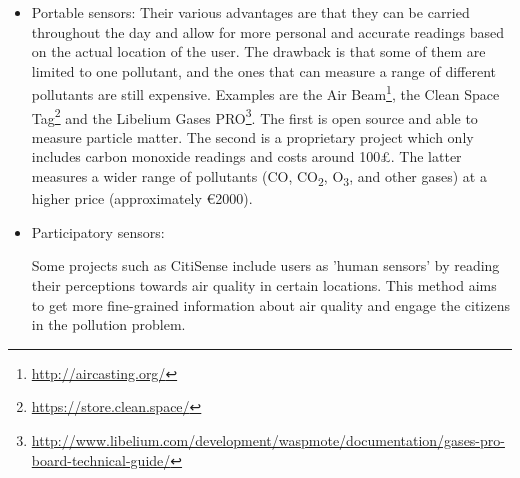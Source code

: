 \begin{itemize}
\item Portable sensors: Their various advantages are that they can be carried throughout the day and allow for more personal and accurate readings based on the actual location of the user. The drawback is that some of them are limited to one pollutant, and the ones that can measure a range of different pollutants are still expensive. Examples are the Air Beam\footnote{\url{http://aircasting.org/}}, the Clean Space Tag\footnote{\url{https://store.clean.space/}} and the Libelium Gases PRO\footnote{\url{http://www.libelium.com/development/waspmote/documentation/gases-pro-board-technical-guide/}}. The first is open source and able to measure particle matter. The second is a proprietary project which only includes carbon monoxide readings and costs around 100\pounds. The latter measures a wider range of pollutants (CO, CO\textsubscript{2}, O\textsubscript{3}, \NOX and other gases) at a higher price (approximately \euro{}2000). 

\item Participatory sensors:

Some projects such as CitiSense \cite{Nikzad2012} include users as 'human sensors' by reading their perceptions towards air quality in certain locations. This method aims to get more fine-grained information about air quality and engage the citizens in the pollution problem. 

\end{itemize}



